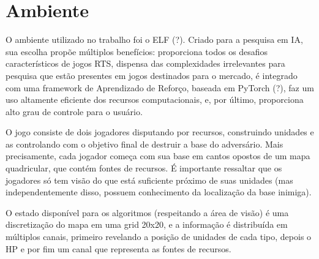 \chapter{Ambiente}
\label{cap:ambiente}

O ambiente utilizado no trabalho foi o ELF (?).
Criado para a pesquisa em IA, sua escolha propõe múltiplos benefícios: 
proporciona todos os desafios característicos de jogos RTS,
dispensa das complexidades irrelevantes para pesquisa que estão presentes em jogos destinados para o mercado,
é integrado com uma framework de Aprendizado de Reforço, baseada em PyTorch (?),
faz um uso altamente eficiente dos recursos computacionais,
e, por último, proporciona alto grau de controle para o usuário.

O jogo consiste de dois jogadores 
disputando por recursos, 
construindo unidades 
e as controlando 
com o objetivo final de destruir a base do adversário.
Mais precisamente, 
cada jogador começa com sua base em cantos opostos de um mapa quadricular,
que contém fontes de recursos. 
É importante ressaltar que os jogadores só tem visão do que está suficiente próximo de suas unidades 
(mas independentemente disso, possuem conhecimento da localização da base inimiga).

O estado disponível para os algoritmos (respeitando a área de visão) é uma discretização do mapa em uma grid 20x20,
e a informação é distribuída em múltiplos canais, 
primeiro revelando a posição de unidades de cada tipo, 
depois o HP 
e por fim um canal que representa as fontes de recursos.


